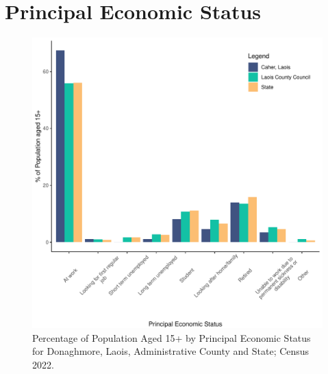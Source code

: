 \documentclass{article}
\begin{document}
  
\pagebreak
\section{Principal Economic Status}\label{sect:PES}
\begin{figure}[H]
	\centering
	\includegraphics[width = 140mm]{../figures/PESED.pdf}
	\caption{Percentage of Population Aged 15+ by Principal Economic Status for Donaghmore, Laois, Administrative County and State; Census 2022.}
	\label{fig:vbnv}
	\end{figure}
\end{document}
